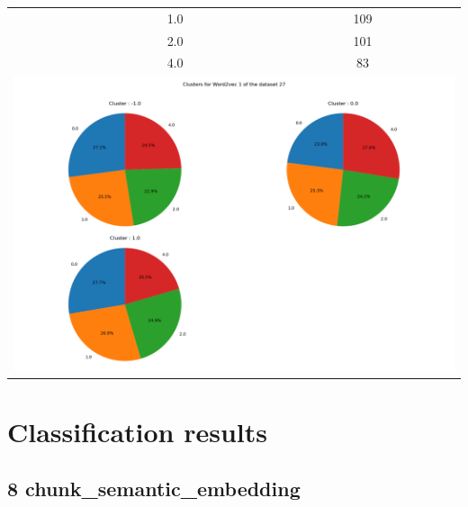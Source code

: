 \begin{longtable}{|c|c|c|c|c|}
& \multicolumn{2}{c|}{1.0} & \multicolumn{2}{c|}{109} \\
& \multicolumn{2}{c|}{2.0} & \multicolumn{2}{c|}{101} \\
& \multicolumn{2}{c|}{4.0} & \multicolumn{2}{c|}{83} \\
\hline
\multicolumn{5}{|c|}{\includegraphics[width=0.8\linewidth]{img/annexes/27/clustering_pie_charts/Word2vec 1.png}} \\
\end{longtable}


\section{Classification results}

\label{sec:annexe:classification_results}

\subsection{8 chunk\_semantic\_embedding}

